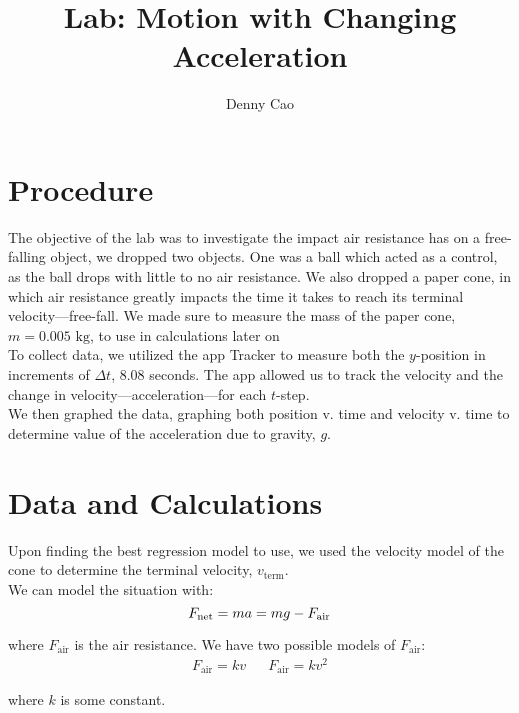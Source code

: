 \documentclass{article}
\begin{document}
\title{Lab: Motion with Changing Acceleration}
\author{Denny Cao}

\maketitle

\section{Procedure}
The objective of the lab was to investigate the impact air resistance has on a free-falling object, 
we dropped two objects. One was a ball which acted as a control, as the ball drops with little to no air resistance. 
We also dropped a paper cone, in which air resistance greatly impacts the time it takes to reach its terminal velocity—free-fall.
We made sure to measure the mass of the paper cone, $m = 0.005 \text{ kg}$, to use in calculations later on \\

\noindent
To collect data, we utilized the app Tracker to measure both the $y$-position in increments of $\Delta t$, 8.08 seconds.
The app allowed us to track the velocity and the change in velocity—acceleration—for each $t$-step. \\

\noindent
We then graphed the data, graphing both position v. time and velocity v. time to 
determine value of the acceleration due to gravity, $g$.

\section{Data and Calculations}
Upon finding the best regression model to use, 
we used the velocity model of the cone to determine the terminal velocity, $v_\text{term}$. \\

\noindent
We can model the situation with:
$$
F_\text{net} = ma = mg - F_\text{air} \\
$$

\noindent
where $F_\text{air}$ is the air resistance. We have two possible models of $F_\text{air}$:
\begin{align*}
    F_\text{air} = kv && F_\text{air} = kv^2
\end{align*}

\noindent
where $k$ is some constant. \\
\end{document}
